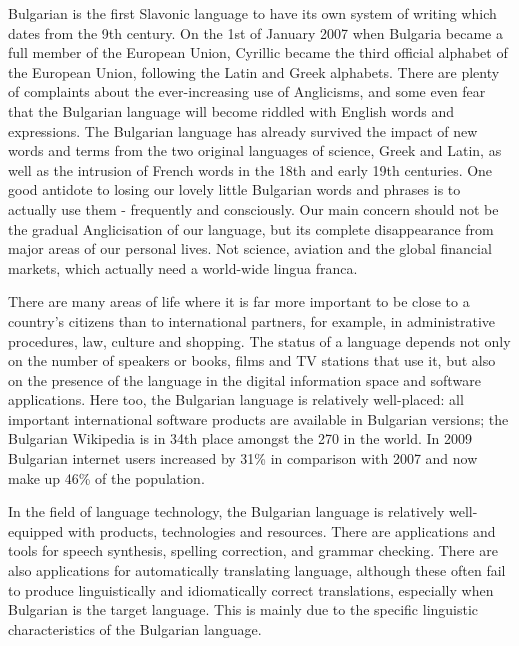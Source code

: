 \begin{multicols}{2}
Bulgarian is the first Slavonic language to have its own system of writing which dates from the 9th century. On the 1st of January 2007 when Bulgaria became a full member of the European Union, Cyrillic became the third official alphabet of the European Union, following the Latin and Greek alphabets. 
There are plenty of complaints about the ever-increasing use of Anglicisms, and some even fear that the Bulgarian language will become riddled with English words and expressions. The Bulgarian language has already survived the impact of new words and terms from the two original languages of science, Greek and Latin, as well as the intrusion of French words in the 18th and early 19th centuries. One good antidote to losing our lovely little Bulgarian words and phrases is to actually use them - frequently and consciously. Our main concern should not be the gradual Anglicisation of our language, but its complete disappearance from major areas of our personal lives. Not science, aviation and the global financial markets, which actually need a world-wide lingua franca.

There are many areas of life where it is far more important to be close to a country’s citizens than to international partners, for example, in administrative procedures, law, culture and shopping. The status of a language depends not only on the number of speakers or books, films and TV stations that use it, but also on the presence of the language in the digital information space and software applications. 
Here too, the Bulgarian language is relatively well-placed: all important international software products are available in Bulgarian versions; the Bulgarian Wikipedia is in 34th place amongst the 270 in the world. In 2009 Bulgarian internet users increased by 31\% in comparison with 2007 and now make up 46\% of the population.

In the field of language technology, the Bulgarian language is relatively well-equipped with products, technologies and resources. There are applications and tools for speech synthesis, spelling correction, and grammar checking. There are also applications for automatically translating language, although these often fail to produce linguistically and idiomatically correct translations, especially when Bulgarian is the target language. This is mainly due to the specific linguistic characteristics of the Bulgarian language. 


\end{multicols}
